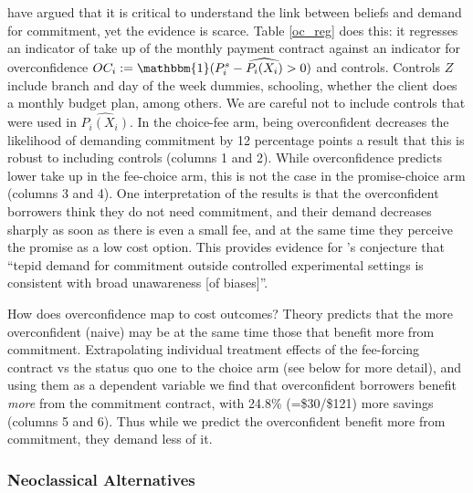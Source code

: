 \documentclass[oneside,11pt]{article}
\begin{document}
\cite{Sprenger} have argued that it is critical to understand the link between beliefs and demand for commitment, yet the evidence is scarce. Table \ref{oc_reg} does this: it regresses an indicator of take up of the monthly payment contract against an indicator for overconfidence $OC_i:=\mathbbm{1}(P^s_i-\widehat{P_i(X_i)}>0)$ and controls. Controls $Z$ include branch and day of the week dummies, schooling, whether the client does a monthly budget plan, among others. We are careful not to include controls that were used in $\widehat{P_i(X_i)}$. %
In the choice-fee arm, being overconfident decreases the likelihood of demanding commitment by 12 percentage points a result that this is robust to including controls  (columns 1 and 2). While overconfidence predicts lower take up in the fee-choice arm, this is not the case in the promise-choice arm (columns 3 and 4).  One interpretation of the results is that the overconfident borrowers think they do not need commitment, and their demand decreases sharply as soon as there is even a small fee, and at the same time they perceive the promise as a low cost option. This provides evidence for \cite{Sprenger}'s conjecture that ``tepid demand for commitment outside controlled experimental settings is consistent with broad unawareness [of biases]''. 

How does overconfidence map to cost outcomes? Theory predicts that the more overconfident (naive) may be at the same time those that benefit more from commitment. Extrapolating individual treatment effects of the fee-forcing contract vs the status quo one to the choice arm (see below for more detail), and using them as a dependent variable we find that overconfident borrowers benefit \textit{more} from the commitment contract, with {24.8}\% (=\${30}/\${121}) more savings (columns 5 and 6). Thus while we predict the overconfident benefit more from commitment, they demand less of it. 



\subsubsection{Neoclassical Alternatives} \label{neoclasical}
\end{document}
